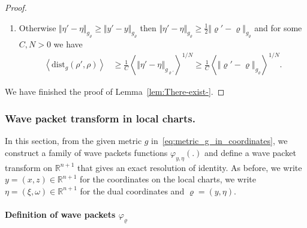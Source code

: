 \documentclass[AHL,Unicode,longabstracts,published]{cedram}
\newcommand{\dist}{\mathrm{dist}}
\newcommand{\bbR}{\mathbb{R}}
\newcommand{\bbR}{\mathbb{R}}
\begin{document}
\begin{proof}
\begin{enumerate}
\begin{enumerate}
\begin{align*}
& \geq\frac{1}{C}\left\langle \left\Vert \varrho'-\varrho\right\Vert _{g_{\varrho}}\right\rangle ^{1/N}.
\end{align*}
\item Otherwise $\Vert \eta'-\eta\Vert _{g_{\varrho}}\geq\Vert y'-y\Vert _{g_{\varrho}}$ then $\Vert \eta'-\eta\Vert _{g_{\varrho}}\geq\frac{1}{2}\Vert \varrho'-\varrho\Vert _{g_{\varrho}}$ and for some $C,N>0$ we have
\begin{align*}
\left\langle \dist_{g}\left(\rho',\rho\right)\right\rangle & \geq\frac{1}{C}\left\langle \left\Vert \eta'-\eta\right\Vert _{g_{\varrho'}}\right\rangle ^{1/N}\geq\frac{1}{C}\left\langle \left\Vert \varrho'-\varrho\right\Vert _{g_{\varrho}}\right\rangle ^{1/N}.
\end{align*}
\end{enumerate}
\end{enumerate}
We have finished the proof of Lemma~\ref{lem:There-exist-}.
\end{proof}

\subsubsection{\label{subsec:Bargmann-transform-on}
Wave packet transform in local charts.}

In this section, from the given metric $g$ in~\eqref{eq:metric_g_in_coordinates}, we construct a family of wave packets functions $\varphi_{y,\eta}(.)$ and define a wave packet transform on $\bbR^{n+1}$ that gives an exact resolution of identity. As before, we write $y=(x,z)\in\bbR^{n+1}$ for the coordinates on the local charts, we write $\eta=(\xi,\omega)\in\bbR^{n+1}$ for the dual coordinates and $\varrho=(y,\eta)$.

\paragraph{Definition of wave packets $\varphi_{\varrho}$}
\end{document}
